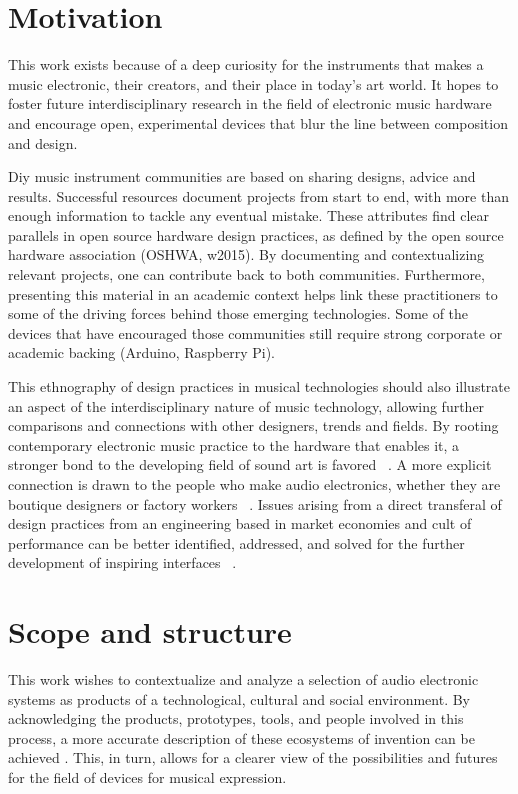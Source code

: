 \section{Motivation}

This work exists because of a deep curiosity for the instruments that makes a music electronic, their creators, and their place in today's art world. It hopes to foster future interdisciplinary research in the field of electronic music hardware and encourage open, experimental devices that blur the line between composition and design. 

Diy music instrument communities are based on sharing designs, advice and results. Successful resources document projects from start to end, with more than enough information to tackle any eventual mistake. These attributes find clear parallels in open source hardware design practices, as defined by the open source hardware association (OSHWA, w2015). By documenting and contextualizing relevant projects, one can contribute back to both communities. Furthermore, presenting this material in an academic context helps link these practitioners to some of the driving forces behind those emerging technologies. Some of the devices that have encouraged those communities still require strong corporate or academic backing (Arduino, Raspberry Pi). 

This ethnography of design practices in musical technologies should also illustrate an aspect of the interdisciplinary nature of music technology, allowing further comparisons and connections with other designers, trends and fields. By rooting contemporary electronic music practice to the hardware that enables it, a stronger bond to the developing field of sound art is favored ~\citep{cluett2013}. A more explicit connection is drawn to the people who make audio electronics, whether they are boutique designers or factory workers ~\citep{rylan2015}.  Issues arising from a direct transferal of design practices from an engineering based in market economies and cult of performance can be better identified, addressed, and solved for the further development of inspiring interfaces ~\citep{ghazala2004,christensen2005,Feldman2007,silver2009,perner2011,hertz2012,riis2013,jackson2014}.

\section{Scope and structure}

This work wishes to contextualize and analyze a selection of audio electronic systems as products of a technological, cultural and social environment. By acknowledging the products, prototypes, tools, and people involved in this process, a more accurate description of these ecosystems of invention can be achieved \citep{vinck2003}. This, in turn, allows for a clearer view of the possibilities and futures for the field of devices for musical expression. 
	
